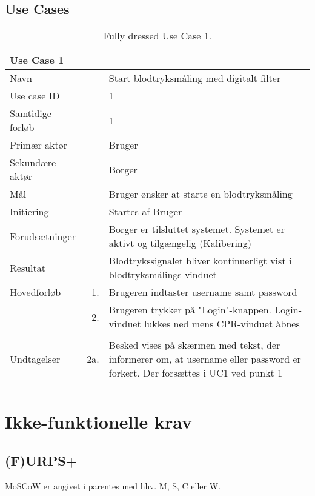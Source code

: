 \subsection{Use Cases}

\begin{longtabu} to  %
    {\large \textbf{Use Case 1}} && \\
    \toprule
    Navn &&    Start blodtryksmåling med digitalt filter\\
    Use case ID &&    1\\
    Samtidige forløb &&    1\\
    Primær aktør &&    Bruger\\
    Sekundære aktør &&	Borger \\
    Mål &&    Bruger ønsker at starte en blodtryksmåling\\
    Initiering &&	Startes af Bruger\\
    Forudsætninger &&  Borger er tilsluttet systemet. Systemet er aktivt og tilgængelig (Kalibering)  \\
    Resultat &&		Blodtrykssignalet bliver kontinuerligt vist i blodtryksmålings-vinduet                         \\ \midrule
    Hovedforløb &    1. &    Brugeren indtaster username samt password\\[-1ex]   						 	
                &    2. &    Brugeren trykker på "Login"\--knappen. Login-vinduet lukkes ned mens CPR-vinduet åbnes\\[-1ex]
                &    \\ \midrule
                
    Undtagelser &    2a. & Besked vises på skærmen med tekst, der informerer om, at username eller password er forkert. Der forsættes i UC1 ved punkt 1     \\ \bottomrule
\caption{Fully dressed Use Case 1.}
\label{UC1}
\end{longtabu}


\section{Ikke-funktionelle krav}


\subsection{(F)URPS+}
MoSCoW er angivet i parentes med hhv. M, S, C eller W.


